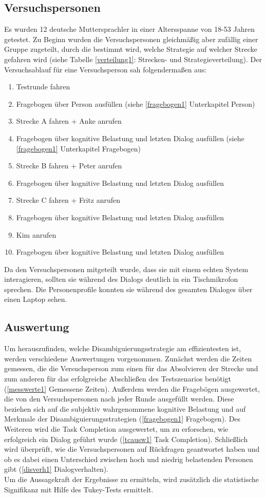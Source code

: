 \documentclass[12pt,a4paper]{scrartcl}
\begin{document}
\subsection{Versuchspersonen}
Es wurden 12 deutsche Muttersprachler in einer Altersspanne von 18-53 Jahren getestet. Zu Beginn wurden die Versuchspersonen gleichmäßig aber zufällig einer Gruppe zugeteilt, durch die bestimmt wird, welche Strategie auf welcher Strecke gefahren wird (siehe Tabelle \ref{verteilung1}: Strecken- und Strategieverteilung).
Der Versuchsablauf für eine Versuchsperson sah folgendermaßen aus:
\begin{enumerate}
\item Testrunde fahren
\item Fragebogen über Person ausfüllen (siehe \ref{fragebogen1} Unterkapitel Person)
\item Strecke A fahren + Anke anrufen
\item Fragebogen über kognitive Belastung und letzten Dialog ausfüllen (siehe \ref{fragebogen1} Unterkapitel Fragebogen)
\item Strecke B fahren + Peter anrufen
\item Fragebogen über kognitive Belastung und letzten Dialog ausfüllen
\item Strecke C fahren + Fritz anrufen
\item Fragebogen über kognitive Belastung und letzten Dialog ausfüllen 
\item Kim anrufen
\item Fragebogen über kognitive Belastung und letzten Dialog ausfüllen 
\end{enumerate}

Da den Versuchspersonen mitgeteilt wurde, dass sie mit einem echten System interagieren, sollten sie während des Dialogs deutlich in ein Tischmikrofon sprechen. Die Personenprofile konnten sie während des gesamten Dialoges über einen Laptop sehen.

\subsection{Auswertung}
\label{auswertung1}
Um herauszufinden, welche Disambiguierungsstrategie am effizientesten ist, werden verschiedene Auswertungen vorgenommen. 
Zunächst werden die Zeiten gemessen, die die Versuchsperson zum einen für das Absolvieren der Strecke und zum anderen für das erfolgreiche Abschließen des Testszenarios benötigt (\ref{messwerte1} Gemessene Zeiten).
Außerdem werden die Fragebögen ausgewertet, die von den Versuchspersonen nach jeder Runde ausgefüllt werden. Diese beziehen sich auf die subjektiv wahrgenommene kognitive Belastung und auf Merkmale der Disambiguierungsstrategien (\ref{fragebogen1} Fragebogen). Des Weiteren wird die Task Completion ausgewertet, um zu erforschen, wie erfolgreich ein Dialog geführt wurde (\ref{tcausw1} Task Completion). Schließlich wird überprüft, wie die Versuchspersonen auf Rückfragen geantwortet haben und ob es dabei einen Unterschied zwischen hoch und niedrig belastenden Personen gibt (\ref{disverh1} Dialogverhalten). \\
Um die Aussagekraft der Ergebnisse zu ermitteln, wird zusätzlich die statistische Signifikanz mit Hilfe des Tukey-Tests ermittelt. 
\end{document}
